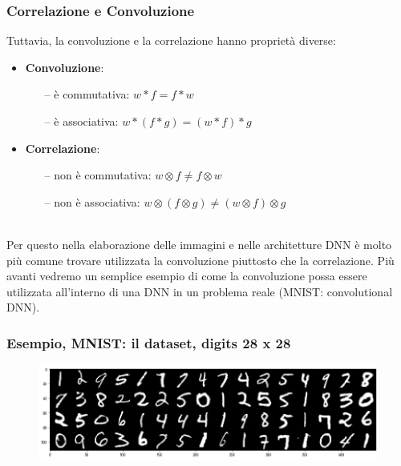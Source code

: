 \begin{frame}

	\frametitle{Correlazione e Convoluzione}

	Tuttavia, la convoluzione e la correlazione hanno proprietà diverse:
	\begin{itemize}
		\item \textbf{Convoluzione}:
			\begin{itemize}
				\item[--] è commutativa: $w * f = f * w$
				\item[--] è associativa: $w * (f * g) = (w * f) * g$
			\end{itemize}
		\item \textbf{Correlazione}:
			\begin{itemize}
				\item[--] non è commutativa: $w \otimes f \neq f \otimes w$
				\item[--] non è associativa: $w \otimes (f \otimes g) \neq (w \otimes f) \otimes g$
			\end{itemize}
	\end{itemize}
	\ \\
	Per questo nella elaborazione delle immagini e nelle architetture DNN è molto più comune trovare utilizzata la convoluzione piuttosto che la correlazione.
	\newlinedouble
	Più avanti vedremo un semplice esempio di come la convoluzione possa essere utilizzata all'interno di una DNN in un problema reale (MNIST: convolutional DNN).

\end{frame}


\begin{frame}

	\frametitle{Esempio, MNIST: il dataset, digits 28 x 28}

	\begin{figure}[!htbp]
		\centering
		\includegraphics[width=1.0\linewidth]{images/supervised/z_algorithms_deep_learning/mnist.png}
	\end{figure}

\end{frame}


